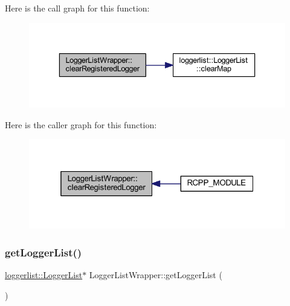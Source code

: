 Here is the call graph for this function\+:\nopagebreak
\begin{figure}[H]
\begin{center}
\leavevmode
\includegraphics[width=336pt]{class_logger_list_wrapper_a501bae5e1dda3dba04b2915d7dbbe3a7_cgraph}
\end{center}
\end{figure}
Here is the caller graph for this function\+:\nopagebreak
\begin{figure}[H]
\begin{center}
\leavevmode
\includegraphics[width=319pt]{class_logger_list_wrapper_a501bae5e1dda3dba04b2915d7dbbe3a7_icgraph}
\end{center}
\end{figure}
\mbox{\label{class_logger_list_wrapper_ab128c208c6cd017de1cfe08f3e996b2a}} 
\subsubsection{\texorpdfstring{get\+Logger\+List()}{getLoggerList()}}
{\footnotesize\ttfamily \mbox{\hyperlink{classloggerlist_1_1_logger_list}{loggerlist\+::\+Logger\+List}}$\ast$ Logger\+List\+Wrapper\+::get\+Logger\+List (\begin{DoxyParamCaption}{ }\end{DoxyParamCaption})\hspace{0.3cm}{\ttfamily [inline]}}

